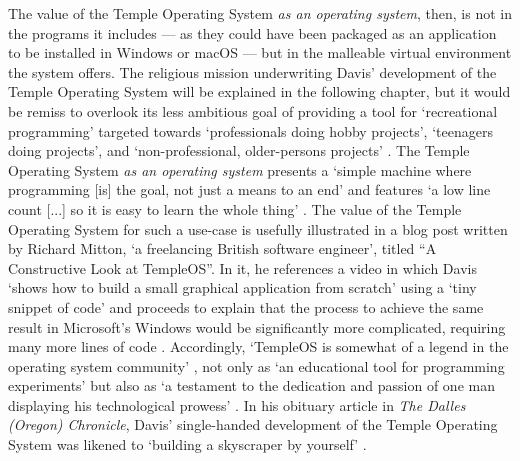 \documentclass[Draft.tex]{subfiles}
\begin{document}
The value of the Temple Operating System \textit{as an operating system},
then, is not in the programs it includes --- as they could have
been packaged as an application to be installed in Windows or macOS ---
but in the malleable virtual environment the system offers.
The religious mission underwriting Davis' development of the
Temple Operating System will be explained in the following chapter,
but it would be remiss to overlook its less ambitious goal of providing
a tool for `recreational programming' targeted towards
`professionals doing hobby projects', `teenagers doing projects',
and `non-professional, older-persons projects' \parencite{Welcome}.
The Temple Operating System \textit{as an operating system} presents a
`simple machine where programming [is] the goal, not just a means
to an end' and features `a low line count [...]
so it is easy to learn the whole thing' \parencite{Charter}.
The value of the Temple Operating System for such a use-case is
usefully illustrated in a blog post written by Richard Mitton,
`a freelancing British software engineer', titled
``A Constructive Look at TempleOS''.
In it, he references a video in which Davis `shows how to build a small
graphical application from scratch' using a `tiny snippet of code'
and proceeds to explain that the process to achieve the same result
in Microsoft's Windows would be significantly more
complicated, requiring many more lines of code \parencite{CodersNotes}.
Accordingly, `TempleOS is somewhat of a legend in the
operating system community' \parencite{CodersNotes}, not only as
`an educational tool for programming experiments' but also as
`a testament to the dedication and passion of one man
displaying his technological prowess' \parencite{TechRepublic}.
In his obituary article in \textit{The Dalles (Oregon) Chronicle},
Davis' single-handed development of the Temple Operating System was likened to
`building a skyscraper by yourself' \parencite{Cecil18}.
\end{document}

